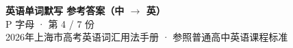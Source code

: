 \documentclass[10pt,a4paper]{article}
\begin{document}
\pagestyle{plain}

\begin{center}
{\LARGE\bfseries 英语单词默写 \quad 参考答案（中 $\to$ 英）}\\[0.22em]
{\large P 字母 · 第 4 / 7 份}\\[0.18em]
{\small 2026年上海市高考英语词汇用法手册 · 参照普通高中英语课程标准}
\end{center}

\vspace{0.2em}
\noindent{\color{rulegray}\rule{\textwidth}{0.8pt}}

\vspace{0.35em}

\vspace{0.25em}
\renewcommand{\arraystretch}{1.32}
\end{document}
